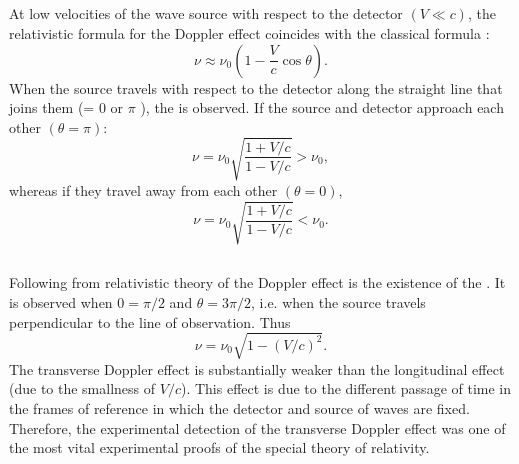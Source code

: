 \subsection{}\label{31.6.2} At low velocities of the wave source with respect to the detector $(V \ll c)$, the relativistic formula for the Doppler effect  coincides with the classical formula :
\begin{equation*}%
\nu \approx \nu_{0} \left( 1 - \frac{V}{c} \cos \theta \right).
\end{equation*}
When the source travels with respect to the detector along the
straight line that joins them (\theta = 0 or $\pi$ ), the  is observed. If the source and detector approach each other $(\theta = \pi)$:
\begin{equation*}%
\nu = \nu_{0} \sqrt{\frac{1 + V/c}{1 - V/c}} > \nu_{0},
\end{equation*}
whereas if they travel away from each other $(\theta = 0)$,
\begin{equation*}%
\nu = \nu_{0} \sqrt{\frac{1 + V/c}{1 - V/c}} < \nu_{0}.
\end{equation*}

\subsection{}\label{31.6.3} Following from relativistic theory of the Doppler effect  is the existence of the . It is observed when $0 = \pi/2$ and $\theta = 3\pi/2$, i.e. when the source
travels perpendicular to the line of observation. Thus
\begin{equation*}%
\nu = \nu_{0} \sqrt{1 - (V/c)^{2}}.
\end{equation*}
The transverse Doppler effect is substantially weaker than the
longitudinal effect (due to the smallness of $V/c$). This effect is due to the different passage of time in the frames of reference in which the detector and source of waves are fixed. Therefore, the experimental detection of the transverse Doppler effect was one of the most vital experimental proofs of the special theory of relativity.

